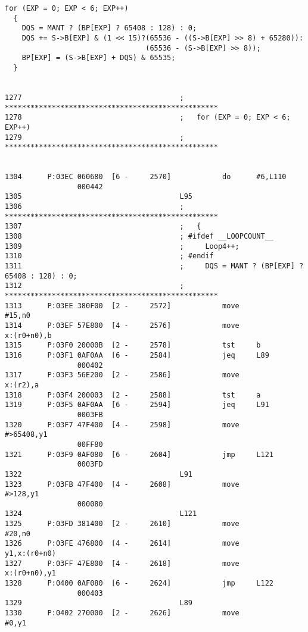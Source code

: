 {\small
\begin{verbatim}
for (EXP = 0; EXP < 6; EXP++)
  {
    DQS = MANT ? (BP[EXP] ? 65408 : 128) : 0;
    DQS += S->B[EXP] & (1 << 15)?(65536 - ((S->B[EXP] >> 8) + 65280)):
                                 (65536 - (S->B[EXP] >> 8));
    BP[EXP] = (S->B[EXP] + DQS) & 65535;
  }


1277                                     ; **************************************************
1278                                     ;   for (EXP = 0; EXP < 6; EXP++)
1279                                     ; **************************************************


1304      P:03EC 060680  [6 -     2570]            do      #6,L110
                 000442
1305                                     L95
1306                                     ; **************************************************
1307                                     ;   {
1308                                     ; #ifdef __LOOPCOUNT__ 
1309                                     ;     Loop4++;
1310                                     ; #endif
1311                                     ;     DQS = MANT ? (BP[EXP] ? 65408 : 128) : 0;
1312                                     ; **************************************************
1313      P:03EE 380F00  [2 -     2572]            move              #15,n0
1314      P:03EF 57E800  [4 -     2576]            move              x:(r0+n0),b
1315      P:03F0 20000B  [2 -     2578]            tst     b
1316      P:03F1 0AF0AA  [6 -     2584]            jeq     L89
                 000402
1317      P:03F3 56E200  [2 -     2586]            move              x:(r2),a
1318      P:03F4 200003  [2 -     2588]            tst     a
1319      P:03F5 0AF0AA  [6 -     2594]            jeq     L91
                 0003FB
1320      P:03F7 47F400  [4 -     2598]            move              #>65408,y1
                 00FF80
1321      P:03F9 0AF080  [6 -     2604]            jmp     L121
                 0003FD
1322                                     L91
1323      P:03FB 47F400  [4 -     2608]            move              #>128,y1
                 000080
1324                                     L121
1325      P:03FD 381400  [2 -     2610]            move              #20,n0
1326      P:03FE 476800  [4 -     2614]            move              y1,x:(r0+n0)
1327      P:03FF 47E800  [4 -     2618]            move              x:(r0+n0),y1
1328      P:0400 0AF080  [6 -     2624]            jmp     L122
                 000403
1329                                     L89
1330      P:0402 270000  [2 -     2626]            move              #0,y1

\end{verbatim}}
